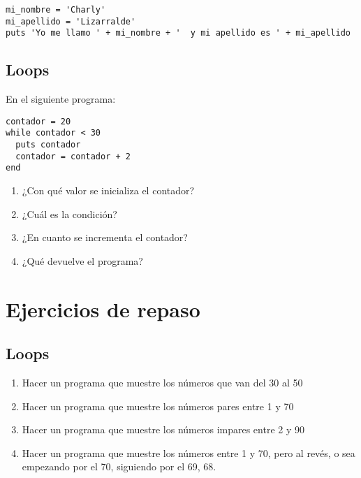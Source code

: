\begin{lstlisting}
mi_nombre = 'Charly'
mi_apellido = 'Lizarralde'
puts 'Yo me llamo ' + mi_nombre + '  y mi apellido es ' + mi_apellido
\end{lstlisting}

\subsection{Loops}
En el siguiente programa:

\begin{lstlisting}
contador = 20
while contador < 30
  puts contador
  contador = contador + 2
end
\end{lstlisting}
\begin{enumerate}
  \item ¿Con qué valor se inicializa el contador?
  \item ¿Cuál es la condición?
  \item ¿En cuanto se incrementa el contador?
  \item ¿Qué devuelve el programa?
\end{enumerate}

\section{Ejercicios de repaso}
\subsection{Loops}
\begin{enumerate}
  \item Hacer un programa que muestre los números que van del 30 al 50
  \item Hacer un programa que muestre los números pares entre 1 y 70
  \item Hacer un programa que muestre los números impares entre 2 y 90
  \item Hacer un programa que muestre los números entre 1 y 70, pero al revés, o sea empezando por el 70, siguiendo por el 69, 68.
\end{enumerate}

